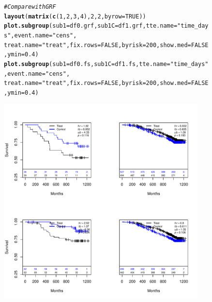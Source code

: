 \documentclass[9pt]{article}\usepackage[]{graphicx}\usepackage[]{xcolor}
\makeatletter
\newcommand{\hlnum}[1]{\textcolor[rgb]{0.686,0.059,0.569}{#1}}%
\newcommand{\hlstr}[1]{\textcolor[rgb]{0.192,0.494,0.8}{#1}}%
\newcommand{\hlcom}[1]{\textcolor[rgb]{0.678,0.584,0.686}{\textit{#1}}}%
\newcommand{\hlstd}[1]{\textcolor[rgb]{0.345,0.345,0.345}{#1}}%
\newcommand{\hlkwc}[1]{\textcolor[rgb]{0.333,0.667,0.333}{#1}}%
\newcommand{\hlkwd}[1]{\textcolor[rgb]{0.737,0.353,0.396}{\textbf{#1}}}%
\newenvironment{kframe}{%
 \def\at@end@of@kframe{}%
 \ifinner\ifhmode%
  \def\at@end@of@kframe{\end{minipage}}%
  \begin{minipage}{\columnwidth}%
 \fi\fi%
 \def\FrameCommand##1{\hskip\@totalleftmargin \hskip-\fboxsep
 \colorbox{shadecolor}{##1}\hskip-\fboxsep
     \hskip-\linewidth \hskip-\@totalleftmargin \hskip\columnwidth}%
 \MakeFramed {\advance\hsize-\width
   \@totalleftmargin\z@ \linewidth\hsize
   \@setminipage}}%
 {\par\unskip\endMakeFramed%
 \at@end@of@kframe}
\newenvironment{knitrout}{}{} %
\theoremstyle{definition}
\theoremstyle{remark}
\makeatother
\begin{document}
\begin{figure}[h!]
\begin{center}
\begin{knitrout}
\color{fgcolor}\begin{kframe}
\begin{alltt}
\hlcom{# Compare with GRF}
\hlkwd{layout}\hlstd{(}\hlkwd{matrix}\hlstd{(}\hlkwd{c}\hlstd{(}\hlnum{1}\hlstd{,} \hlnum{2}\hlstd{,} \hlnum{3}\hlstd{,} \hlnum{4}\hlstd{),} \hlnum{2}\hlstd{,} \hlnum{2}\hlstd{,} \hlkwc{byrow} \hlstd{=} \hlnum{TRUE}\hlstd{))}
\hlkwd{plot.subgroup}\hlstd{(}\hlkwc{sub1} \hlstd{= df0.grf,} \hlkwc{sub1C} \hlstd{= df1.grf,} \hlkwc{tte.name} \hlstd{=} \hlstr{"time_days"}\hlstd{,} \hlkwc{event.name} \hlstd{=} \hlstr{"cens"}\hlstd{,}
    \hlkwc{treat.name} \hlstd{=} \hlstr{"treat"}\hlstd{,} \hlkwc{fix.rows} \hlstd{=} \hlnum{FALSE}\hlstd{,} \hlkwc{byrisk} \hlstd{=} \hlnum{200}\hlstd{,} \hlkwc{show.med} \hlstd{=} \hlnum{FALSE}\hlstd{,} \hlkwc{ymin} \hlstd{=} \hlnum{0.4}\hlstd{)}
\hlkwd{plot.subgroup}\hlstd{(}\hlkwc{sub1} \hlstd{= df0.fs,} \hlkwc{sub1C} \hlstd{= df1.fs,} \hlkwc{tte.name} \hlstd{=} \hlstr{"time_days"}\hlstd{,} \hlkwc{event.name} \hlstd{=} \hlstr{"cens"}\hlstd{,}
    \hlkwc{treat.name} \hlstd{=} \hlstr{"treat"}\hlstd{,} \hlkwc{fix.rows} \hlstd{=} \hlnum{FALSE}\hlstd{,} \hlkwc{byrisk} \hlstd{=} \hlnum{200}\hlstd{,} \hlkwc{show.med} \hlstd{=} \hlnum{FALSE}\hlstd{,} \hlkwc{ymin} \hlstd{=} \hlnum{0.4}\hlstd{)}
\end{alltt}
\end{kframe}
\includegraphics[width=400px,height=400px]{figure/grf-fs_sg-1} 
\end{knitrout}
\end{center}
\end{figure}
\end{document}
